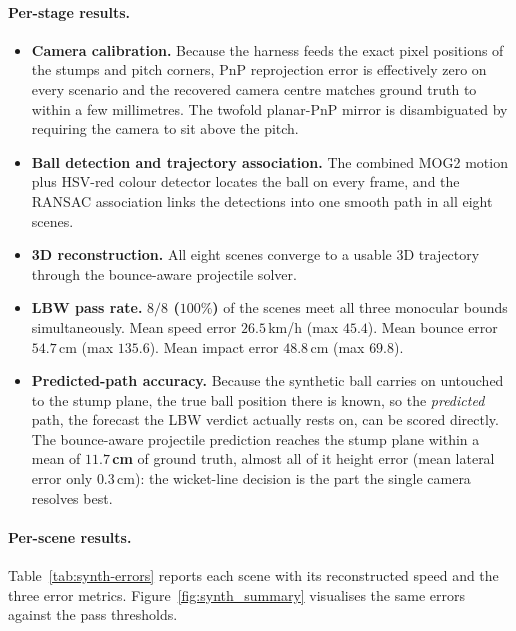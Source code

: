 \documentclass[12pt,a4paper]{report}
\begin{document}
\paragraph{Per-stage results.}
\begin{itemize}
    \item \textbf{Camera calibration.} Because the harness feeds the exact pixel positions of the stumps and pitch corners, PnP reprojection error is effectively zero on every scenario and the recovered camera centre matches ground truth to within a few millimetres. The twofold planar-PnP mirror is disambiguated by requiring the camera to sit above the pitch.
    \item \textbf{Ball detection and trajectory association.} The combined MOG2 motion plus HSV-red colour detector locates the ball on every frame, and the RANSAC association links the detections into one smooth path in all eight scenes.
    \item \textbf{3D reconstruction.} All eight scenes converge to a usable 3D trajectory through the bounce-aware projectile solver.
    \item \textbf{LBW pass rate.} \textbf{$8/8$ ($100\%$)} of the scenes meet all three monocular bounds simultaneously. Mean speed error $26.5$\,km/h (max $45.4$). Mean bounce error $54.7$\,cm (max $135.6$). Mean impact error $48.8$\,cm (max $69.8$).
    \item \textbf{Predicted-path accuracy.} Because the synthetic ball carries on untouched to the stump plane, the true ball position there is known, so the \emph{predicted} path, the forecast the LBW verdict actually rests on, can be scored directly. The bounce-aware projectile prediction reaches the stump plane within a mean of \textbf{$11.7$\,cm} of ground truth, almost all of it height error (mean lateral error only $0.3$\,cm): the wicket-line decision is the part the single camera resolves best.
\end{itemize}

\paragraph{Per-scene results.}
Table~\ref{tab:synth-errors} reports each scene with its reconstructed speed and the three error metrics. Figure~\ref{fig:synth_summary} visualises the same errors against the pass thresholds.
\end{document}

